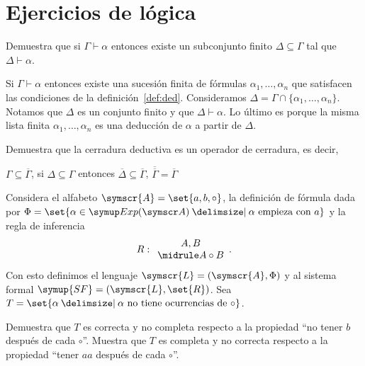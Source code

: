 \documentclass[fc]{tarea}
\newcommand{\al}{\symscr{A}}
\newcommand{\lan}{\symscr{L}}
\newcommand{\sis}{\symup{SF}}
\providecommand\st{}
\newcommand\SetSymbol[1][]{%
\nonscript\:#1\vert
\allowbreak
\nonscript\:
\mathopen{}}
\renewcommand\st{\SetSymbol[\delimsize]}
\begin{document}
\chapter{Ejercicios de lógica}

\begin{exercise}
  Demuestra que si \(\Gamma\vdash\alpha\) entonces existe un subconjunto finito
  \(\Delta\subseteq\Gamma\) tal que \(\Delta\vdash\alpha\).
\end{exercise}
\begin{solution}
  Si \(\Gamma\vdash\alpha\) entonces existe una sucesión finita de fórmulas \(\alpha_1,\ldots,\alpha_n\) que satisfacen las condiciones de la definición~\ref{def:ded}. Consideramos
  \(\Delta=\Gamma\cap\{\alpha_1,\ldots,\alpha_n\}\). Notamos que \(\Delta\) es un conjunto finito y que \(\Delta\vdash\alpha\). Lo último es porque la misma lista finita \(\alpha_1,\ldots,\alpha_n\) es una deducción de \(\alpha\) a partir de \(\Delta\).
\end{solution}

\begin{exercise}
  Demuestra que la cerradura deductiva es un operador de cerradura, es decir,
  \begin{tasks}
    \task \(\Gamma\subseteq\overline{\Gamma}\),
    \task si \(\Delta\subseteq\Gamma\) entonces
      \(\overline{\Delta}\subseteq\overline{\Gamma}\),
    \task \(\overline{\overline{\Gamma}}=\overline{\Gamma}\)
  \end{tasks}
\end{exercise}

\begin{exercise}
  Considera el alfabeto \(\al=\set{a,b,\circ}\), la definición de fórmula dada por \(\Phi=\set{\alpha\in\expr\st\alpha\text{ empieza con }a}\) y la regla de inferencia
  \[
    R:
    \begin{array}{c}
      A,B\\
      \midrule
      A\circ B
    \end{array}.
  \]
  Con esto definimos el lenguaje \(\lan=(\al,\Phi)\) y al sistema formal \(\sis=(\lan,\set{R})\). Sea 
  \(T=\set{\alpha\st\alpha\text{ no tiene ocurrencias de }\circ}\).
  \begin{tasks}
    \task Demuestra que \(T\) es correcta y no completa respecto a la propiedad \enquote{no tener \(b\) después de cada \(\circ\)}.
    \task Muestra que \(T\) es completa y no correcta respecto a la propiedad \enquote{tener \(aa\) después de cada \(\circ\)}.
  \end{tasks}
\end{exercise}
\end{document}
